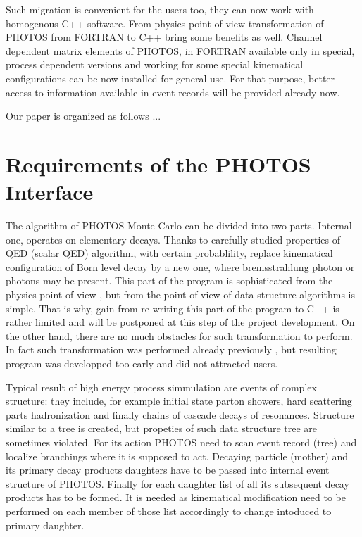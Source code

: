 \documentclass[]{Photos_interface_design}
\begin{document}
Such migration is convenient for the users too,  they can now work
with  homogenous C++ software. From physics point of view transformation 
of PHOTOS 
from FORTRAN to C++  bring some benefits as well.
Channel dependent matrix elements of PHOTOS, in FORTRAN available only 
in special, process dependent versions and working for some special
kinematical configurations
can be now installed for general use.
For that purpose, better access to information available in event records
will be provided already now.



Our paper is organized as follows ...



\section{Requirements of the PHOTOS Interface}
The algorithm of PHOTOS Monte Carlo can be divided into two parts.
Internal one, operates on elementary decays. Thanks to carefully 
studied properties of 
QED (scalar QED) algorithm, with certain probablility, 
replace  kinematical configuration of Born level decay by a new one, 
where bremsstrahlung photon or photons
may be present. This part of the program is sophisticated from the physics 
point of view \cite{Nanava:2006vv,},
but from the point of view of data structure algorithms is simple.
That is why, gain from re-writing this part of the program to C++ is rather
limited and will be postponed at this step of the project development.
On the other hand, there are no much obstacles for such transformation to 
perform. In fact such transformation was performed already
previously \cite{photosplus}, but resulting program was developped too early 
and did not attracted users.

Typical result of high energy process simmulation are events of complex structure:
they include, for example initial state parton showers, hard scattering parts 
hadronization and finally chains of cascade decays of resonances. 
Structure similar to a tree is created, but propeties of such data structure
tree are sometimes violated.
For its action PHOTOS need to scan event record (tree) 
and localize branchings where
it is supposed to act. Decaying particle (mother) and its primary decay products
daughters have to be passed into internal event structure of PHOTOS. 
Finally for each daughter list of all its subsequent decay products has to be 
formed. It is needed as kinematical modification need to be performed on each 
member of those list accordingly to change intoduced to primary daughter.
\end{document}
